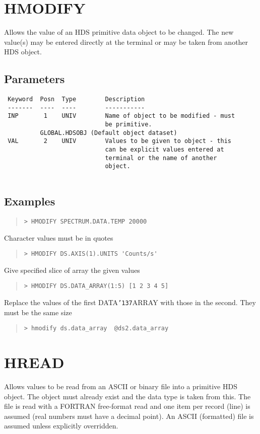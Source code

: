 \documentclass{book}
\renewcommand{\_}{{\tt\char'137}}     %
\begin{document}
\section{HMODIFY}
Allows the value of an HDS primitive data object to be changed.
The new value(s) may be entered directly at the terminal or may
be taken from another HDS object.
 
\subsection{Parameters}
\begin{verbatim}
 Keyword  Posn  Type        Description
 -------  ----  ----        -----------
 INP       1    UNIV        Name of object to be modified - must
                            be primitive.
          GLOBAL.HDSOBJ (Default object dataset)
 VAL       2    UNIV        Values to be given to object - this
                            can be explicit values entered at
                            terminal or the name of another
                            object.
 
\end{verbatim}\subsection{Examples}
\begin{quote}\begin{verbatim}
> HMODIFY SPECTRUM.DATA.TEMP 20000
\end{verbatim}\end{quote}
Character values must be in quotes
\begin{quote}\begin{verbatim}
> HMODIFY DS.AXIS(1).UNITS 'Counts/s'
\end{verbatim}\end{quote}
Give specified slice of array the given values
\begin{quote}\begin{verbatim}
> HMODIFY DS.DATA_ARRAY(1:5) [1 2 3 4 5]
\end{verbatim}\end{quote}
Replace the values of the first DATA\_ARRAY with those in the second.
They must be the same size
\begin{quote}\begin{verbatim}
> hmodify ds.data_array  @ds2.data_array
\end{verbatim}\end{quote}
\section{HREAD}
Allows values to be read from an ASCII or binary file into a
primitive HDS object. The object must already exist and the data
type is taken from this. The file is read with a FORTRAN
free-format read and one item per record (line) is assumed (real
numbers must have a decimal point). An ASCII (formatted) file is
assumed unless explicitly overridden.
 
\end{document}

